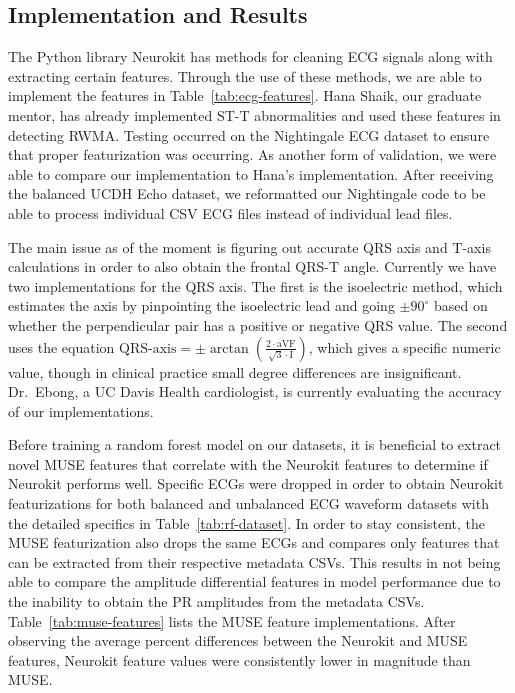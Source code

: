 \documentclass[sigconf,nonacm]{acmart}
\begin{document}
\subsection{Implementation and Results}

The Python library Neurokit has methods for cleaning ECG signals along with extracting certain features. Through the use of these methods, we are able to implement the features in Table~\ref{tab:ecg-features}. Hana Shaik, our graduate mentor, has already implemented ST-T abnormalities and used these features in detecting RWMA. Testing occurred on the Nightingale ECG dataset to ensure that proper featurization was occurring. As another form of validation, we were able to compare our implementation to Hana's implementation. After receiving the balanced UCDH Echo dataset, we reformatted our Nightingale code to be able to process individual CSV ECG files instead of individual lead files.

The main issue as of the moment is figuring out accurate QRS axis and T-axis calculations in order to also obtain the frontal QRS-T angle. Currently we have two implementations for the QRS axis. The first is the isoelectric method, which estimates the axis by pinpointing the isoelectric lead and going $\pm 90^{\circ}$ based on whether the perpendicular pair has a positive or negative QRS value. The second uses the equation $\text{QRS-axis} = \pm \arctan\!\left(\frac{2 \cdot \text{aVF}}{\sqrt{3} \cdot \text{I}}\right)$, which gives a specific numeric value, though in clinical practice small degree differences are insignificant. Dr.\ Ebong, a UC Davis Health cardiologist, is currently evaluating the accuracy of our implementations.

Before training a random forest model on our datasets, it is beneficial to extract novel MUSE features that correlate with the Neurokit features to determine if Neurokit performs well. Specific ECGs were dropped in order to obtain Neurokit featurizations for both balanced and unbalanced ECG waveform datasets with the detailed specifics in Table~\ref{tab:rf-dataset}. In order to stay consistent, the MUSE featurization also drops the same ECGs and compares only features that can be extracted from their respective metadata CSVs. This results in not being able to compare the amplitude differential features in model performance due to the inability to obtain the PR amplitudes from the metadata CSVs. Table~\ref{tab:muse-features} lists the MUSE feature implementations. After observing the average percent differences between the Neurokit and MUSE features, Neurokit feature values were consistently lower in magnitude than MUSE.
\end{document}
